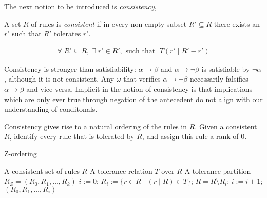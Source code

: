 The next notion to be introduced is \textit{consistency},
\begin{definition}
    A set $R$ of rules is \textit{consistent} if in every non-empty subset $R' \subseteq R$ there exists an $r'$ such that $R'$ tolerates $r'$.
\end{definition}
%
\begin{align}
    \forall \; R' \subseteq R, \; \exists \; r' \in R', \text{ such that } \; T(r'\mid R' - r')
\end{align}

Consistency is stronger than satisfiability: $\alpha \rightarrow \beta$ and $\alpha \rightarrow \neg \beta$ is satisfiable by $\neg \alpha$, although it is not consistent. Any $\omega$ that verifies $\alpha \rightarrow \neg \beta$ necessarily falsifies $\alpha \rightarrow \beta$ and vice versa. Implicit in the notion of consistency is that implications which are only ever true through negation of the antecedent do not align with our understanding of conditonals. \cite{Pearl_SystemZ}


Consistency gives rise to a natural ordering of the rules in $R$. Given a consistent $R$, identify every rule that is tolerated by $R$, and assign this rule a rank of $0$.

\begin{algorithm}
    \caption{Z-ordering}
    \begin{algorithmic}[1]
        \Require A consistent set of rules $R$
        \Require A tolerance relation $T$ over $R$
        \Ensure A tolerance partition $R_Z = (R_0, R_1, \ldots, R_k)$
        \State $i:= 0$;
        \State $R_i := \{r \in R \mid (r\mid R) \in T\}$;
        \State $R = R \setminus R_i$;
        \State $i := i + 1$;
        \EndWhile
        \State \Return $(R_0, R_1, \ldots, R_i)$
    \end{algorithmic}
\end{algorithm}
